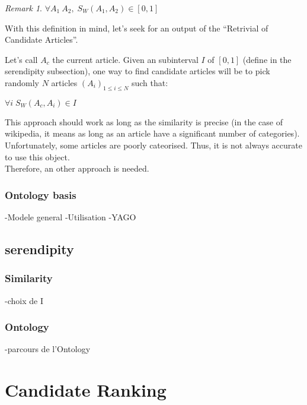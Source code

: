 \documentclass[11pt]{article}
\theoremstyle{plain}
\theoremstyle{definition}
\theoremstyle{remark}
\newtheorem*{rem}{Remark}
\begin{document}
\begin{rem}
  $\forall A_1\: A_2,\; S_W(A_1,A_2) \in [0,1]$
\end{rem}

\vspace*{5mm}
With this definition in mind, let's seek for an output of the ``Retrivial of Candidate Articles''.


Let's call $A_c$ the current article.
Given an subinterval $I$ of $[0,1]$ (define in the serendipity subsection), one way to find candidate articles will be to pick randomly $N$ articles $(A_i)_{1 \leq i \leq N}$ such that:
\begin{center}
  $\forall i \; S_W(A_c,A_i) \in I$
\end{center}

\vspace*{5mm}
This approach should work as long as the similarity is precise (in the case of wikipedia, it means as long as an article have a significant number of categories). Unfortunately, some articles are poorly cateorised. Thus, it is not always accurate to use this object.\\
Therefore, an other approach is needed.






\subsubsection{Ontology basis}


-Modele general
-Utilisation
-YAGO

\subsection{serendipity}

\subsubsection{Similarity}

-choix de I

\subsubsection{Ontology}

-parcours de l'Ontology


\section{Candidate Ranking}
\end{document}
